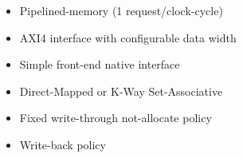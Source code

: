 \begin{itemize}
  \itemsep-0.5em
\item Pipelined-memory (1 request/clock-cycle)  
\item AXI4 interface with configurable data width
\item Simple front-end native interface
\item Direct-Mapped or K-Way Set-Associative
\item Fixed write-through not-allocate policy
\item Write-back policy
\end{itemize}
